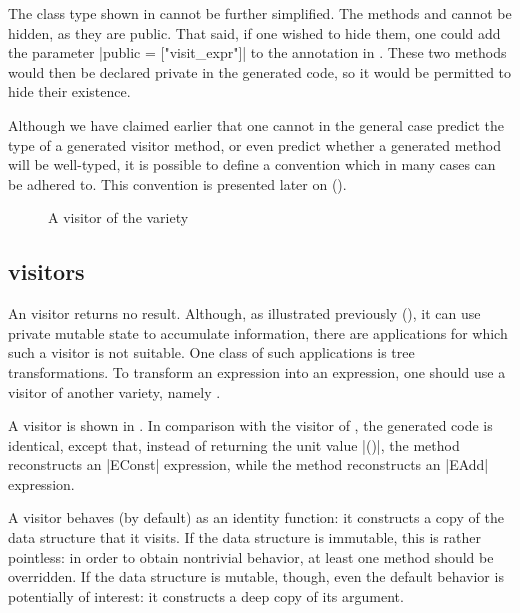 \documentclass[11pt,a4paper,twoside]{article}
\begin{document}
The class type shown in  cannot be further simplified.
The methods  and  cannot be hidden, as
they are public. That said, if one wished to hide them, one could add the parameter %
\oc|public = ["visit_expr"]| to the annotation \derivingvisitors in .
These two methods would then be declared private in the generated code,
so it would be permitted to hide their existence.

Although we have claimed earlier that one cannot in the general case predict
the type of a generated visitor method, or even predict whether a generated
method will be well-typed, it is possible to define a convention which in many
cases can be adhered to. This convention is presented later on
().


\begin{figure}[t]
\vspace{-\baselineskip}
\caption{A visitor of the \map variety}
\label{fig:expr01}
\end{figure}

\subsection{\map visitors}
\label{sec:intro:map}

An \iter visitor returns no result. Although, as illustrated previously
(), it can use private mutable state to accumulate
information, there are applications for which such a visitor is not suitable.
One class of such applications is tree transformations. To transform an
expression into an expression, one should use a visitor of another variety,
namely \map.

A \map visitor is shown in . In comparison with the \iter
visitor of , the generated code is identical, except that,
instead of returning the unit value \oc|()|, the method
 reconstructs an \oc|EConst| expression, while the
method  reconstructs an \oc|EAdd| expression.

A \map visitor behaves (by default) as an identity function: it constructs a
copy of the data structure that it visits. If the data structure is immutable,
this is rather pointless: in order to obtain nontrivial behavior, at least one
method should be overridden. If the data structure is mutable, though, even
the default behavior is potentially of interest: it constructs a deep copy of
its argument.
\end{document}
